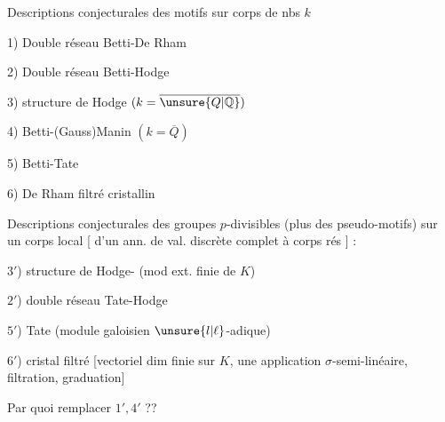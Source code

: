 Descriptions conjecturales des motifs sur corps de nbs  $k$

1) Double réseau Betti-De Rham

2) Double réseau Betti-Hodge

3)  structure de Hodge $(k=\overline{\unsure{Q|\mathbb Q}})$

4)  Betti-(Gauss)Manin $(k=\overline Q)$

5)  Betti-Tate

6)  De Rham filtré cristallin

Descriptions conjecturales des groupes $p$-divisibles  (plus  des pseudo-motifs) sur un corps local [  d'un ann. de val. discrète complet à corps rés ] :

$3'$) structure de Hodge- (mod ext. finie de $K$)

$2'$) double réseau Tate-Hodge

$5'$) Tate (module galoisien $\unsure{l|\ell}$-adique)

$6'$)  cristal filtré [vectoriel  dim finie sur $K$, une application $\sigma$-semi-linéaire,  filtration, graduation]

Par quoi remplacer $1',4'$ ??
